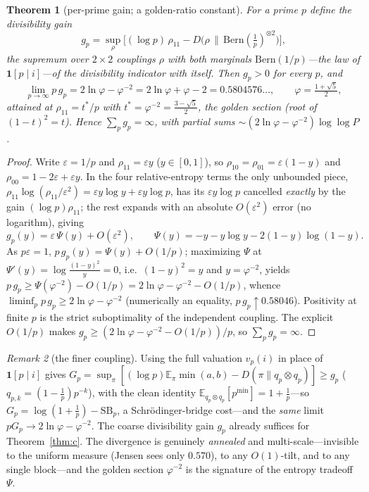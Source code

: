 \documentclass[11pt]{article}
\newtheorem{theorem}{Theorem}
\theoremstyle{remark}\newtheorem{remark}[theorem]{Remark}
\newcommand{\E}{\mathbb E}
\begin{document}
\begin{theorem}[per-prime gain; a golden-ratio constant]\label{thm:gr}
For a prime $p$ define the divisibility gain
\[
 g_p=\sup_{\rho}\Big[(\log p)\,\rho_{11}
 -D\big(\rho\,\|\,\mathrm{Bern}(\tfrac1p)^{\otimes2}\big)\Big],
\]
the supremum over $2\times2$ couplings $\rho$ with both marginals
$\mathrm{Bern}(1/p)$---the law of $\mathbf1[p\mid i]$---of the divisibility
indicator with itself. Then $g_p>0$ for every $p$, and
\[
 \lim_{p\to\infty}p\,g_p=2\ln\varphi-\varphi^{-2}=2\ln\varphi+\varphi-2
 =0.5804576\ldots,\qquad\varphi=\tfrac{1+\sqrt5}2,
\]
attained at $\rho_{11}=t^{*}/p$ with $t^{*}=\varphi^{-2}=\tfrac{3-\sqrt5}2$, the
golden section (root of $(1-t)^2=t$). Hence $\sum_pg_p=\infty$, with partial sums
$\sim(2\ln\varphi-\varphi^{-2})\log\log P$.
\end{theorem}
\begin{proof}
Write $\varepsilon=1/p$ and $\rho_{11}=\varepsilon y$ ($y\in[0,1]$), so
$\rho_{10}=\rho_{01}=\varepsilon(1-y)$ and $\rho_{00}=1-2\varepsilon+\varepsilon
y$. In the four relative-entropy terms the only unbounded piece,
$\rho_{11}\log(\rho_{11}/\varepsilon^2)=\varepsilon y\log y+\varepsilon y\log p$,
has its $\varepsilon y\log p$ cancelled \emph{exactly} by the gain
$(\log p)\rho_{11}$; the rest expands with an absolute $O(\varepsilon^2)$ error
(no logarithm), giving
\[
 g_p(y)=\varepsilon\,\Psi(y)+O(\varepsilon^2),\qquad
 \Psi(y)=-y-y\log y-2(1-y)\log(1-y).
\]
As $p\varepsilon=1$, $p\,g_p(y)=\Psi(y)+O(1/p)$; maximizing $\Psi$ at
$\Psi'(y)=\log\frac{(1-y)^2}{y}=0$, i.e.\ $(1-y)^2=y$ and $y=\varphi^{-2}$,
yields $p\,g_p\ge\Psi(\varphi^{-2})-O(1/p)=2\ln\varphi-\varphi^{-2}-O(1/p)$,
whence $\liminf_p p\,g_p\ge2\ln\varphi-\varphi^{-2}$ (numerically an equality,
$p\,g_p\uparrow0.58046$). Positivity at finite $p$ is the strict suboptimality
of the independent coupling. The explicit $O(1/p)$ makes
$g_p\ge(2\ln\varphi-\varphi^{-2}-O(1/p))/p$, so $\sum_pg_p=\infty$.
\end{proof}
\begin{remark}[the finer coupling]
Using the full valuation $v_p(i)$ in place of $\mathbf1[p\mid i]$ gives
$G_p=\sup_\pi[(\log p)\E_\pi\min(a,b)-D(\pi\|q_p\otimes q_p)]\ge g_p$
($q_{p,k}=(1-\tfrac1p)p^{-k}$), with the clean identity
$\E_{q_p\otimes q_p}[p^{\min}]=1+\tfrac1p$---so $G_p=\log(1+\tfrac1p)
-\mathrm{SB}_p$, a Schr\"odinger-bridge cost---and the \emph{same} limit
$pG_p\to2\ln\varphi-\varphi^{-2}$. The coarse divisibility gain $g_p$ already
suffices for Theorem~\ref{thm:c}. The divergence is genuinely \emph{annealed}
and multi-scale---invisible to the uniform measure (Jensen sees only $0.570$),
to any $O(1)$-tilt, and to any single block---and the golden section
$\varphi^{-2}$ is the signature of the entropy tradeoff $\Psi$.
\end{remark}
\end{document}
